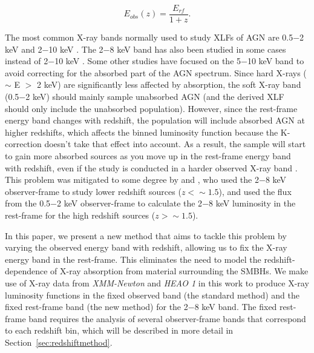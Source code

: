 \documentclass[fleqn,usenatbib]{mnras}
\begin{document}
	\begin{equation}\label{eq:observedenergy}
	E_{obs}(z) = \frac{E_{rf}}{1+z}.
	\end{equation}

The most common X-ray bands normally used to study XLFs of AGN are 0.5$-$2 keV \citep{miyaji2000softxlf, hasinger2005luminosity, ebrero2009xmm} and 2$-$10 keV \citep{aird2010hardxlf, miyaji2015xlfevolution, georgakakis2015xlf}.
The 2$-$8 keV band has also been studied in some cases instead of 2$-$10 keV \citep{barger2005cosmic, silverman2008luminosity}. 
Some other studies have focused on the 5$-$10 keV band \citep{fotopoulou2016xlf} to avoid correcting for the absorbed part of the AGN spectrum. 
Since hard X-rays ($\sim$ E $>$ 2 keV) are significantly less affected by absorption, the soft X-ray band (0.5$-$2 keV) should mainly sample unabsorbed AGN (and the derived XLF should only include the unabsorbed population). 
However, since the rest-frame energy band changes with redshift, the population will include absorbed AGN at higher redshifts, which affects the binned luminosity function because the K-correction doesn't take that effect into account. 
As a result, the sample will start to gain more absorbed sources as you move up in the rest-frame energy band with redshift, even if the study is conducted in a harder observed X-ray band \citep{aird2015nustar}. 
This problem was mitigated to some degree by \cite{cowie2003xlfzevol} and \cite{barger2005cosmic}, who used the 2$-$8 keV observer-frame to study lower redshift sources ($z<\sim1.5$), and used the flux from the 0.5$-$2 keV observer-frame to calculate the 2$-$8 keV luminosity in the rest-frame for the high redshift sources ($z>\sim1.5$).

In this paper, we present a new method that aims to tackle this problem by varying the observed energy band with redshift, allowing us to fix the X-ray energy band in the rest-frame. 
This eliminates the need to model the redshift-dependence of X-ray absorption from material surrounding the SMBHs. 
We make use of X-ray data from \textit{XMM-Newton} and \textit{HEAO 1} in this work to produce X-ray luminosity functions in the fixed observed band (the standard method) and the fixed rest-frame band (the new method) for the 2$-$8 keV band. 
The fixed rest-frame band requires the analysis of several observer-frame bands that correspond to each redshift bin, which will be described in more detail in Section~\ref{sec:redshiftmethod}.
\end{document}
